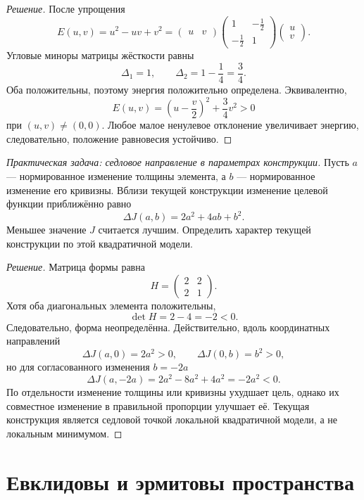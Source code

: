 \begin{proof}[Решение]
После упрощения
\[
E(u,v)=u^2-uv+v^2
=
\begin{pmatrix}u&v\end{pmatrix}
\begin{pmatrix}
1&-\tfrac12\\
-\tfrac12&1
\end{pmatrix}
\begin{pmatrix}u\\v\end{pmatrix}.
\]
Угловые миноры матрицы жёсткости равны
\[
\Delta_1=1,
\qquad
\Delta_2=1-\frac14=\frac34.
\]
Оба положительны, поэтому энергия положительно определена. Эквивалентно,
\[
E(u,v)
=
\left(u-\frac v2\right)^2+\frac34v^2>0
\]
при $(u,v)\neq(0,0)$. Любое малое ненулевое отклонение увеличивает энергию, следовательно, положение равновесия устойчиво.
\end{proof}

\begin{problem}
\textit{Практическая задача: седловое направление в параметрах конструкции.}
Пусть $a$ --- нормированное изменение толщины элемента, а $b$ --- нормированное изменение его кривизны. Вблизи текущей конструкции изменение целевой функции приближённо равно
\[
\Delta J(a,b)=2a^2+4ab+b^2.
\]
Меньшее значение $J$ считается лучшим. Определить характер текущей конструкции по этой квадратичной модели.
\end{problem}

\begin{proof}[Решение]
Матрица формы равна
\[
H=
\begin{pmatrix}
2&2\\
2&1
\end{pmatrix}.
\]
Хотя оба диагональных элемента положительны,
\[
\det H=2-4=-2<0.
\]
Следовательно, форма неопределённа. Действительно, вдоль координатных направлений
\[
\Delta J(a,0)=2a^2>0,
\qquad
\Delta J(0,b)=b^2>0,
\]
но для согласованного изменения $b=-2a$
\[
\Delta J(a,-2a)
=2a^2-8a^2+4a^2
=-2a^2<0.
\]
По отдельности изменение толщины или кривизны ухудшает цель, однако их совместное изменение в правильной пропорции улучшает её. Текущая конструкция является седловой точкой локальной квадратичной модели, а не локальным минимумом.
\end{proof}

\section{Евклидовы и эрмитовы пространства}
\label{sec:euclidean-hermitian}

